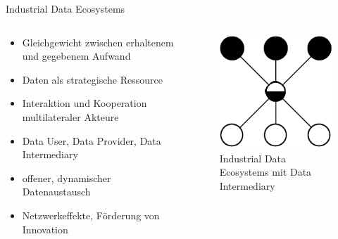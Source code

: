 \begin{frame}{Industrial Data Ecosystems \footnotesize\cite{mollerIndustrialDataEcosystems2024}}
    \begin{columns}
        \begin{column}{0.6\textwidth}
            \begin{itemize}
                \item Gleichgewicht zwischen erhaltenem und gegebenem Aufwand
                \item Daten als strategische Ressource %
                
                \item<2-> Interaktion und Kooperation \alert{multilateraler} Akteure
                \item<2-> Data User, Data Provider, Data Intermediary
                
                \item<3-> offener, dynamischer Datenaustausch
                \item<3-> Netzwerkeffekte, Förderung von Innovation
            \end{itemize}
        \end{column}
        
        \begin{column}{0.4\textwidth}
            \begin{figure}
                \centering
                \includegraphics[height=0.5\textheight]{./assets/industrial_de_architecture.drawio.pdf}
                \caption{Industrial Data Ecosystems mit Data Intermediary}
            \end{figure}
        \end{column}
    \end{columns}
\end{frame}


